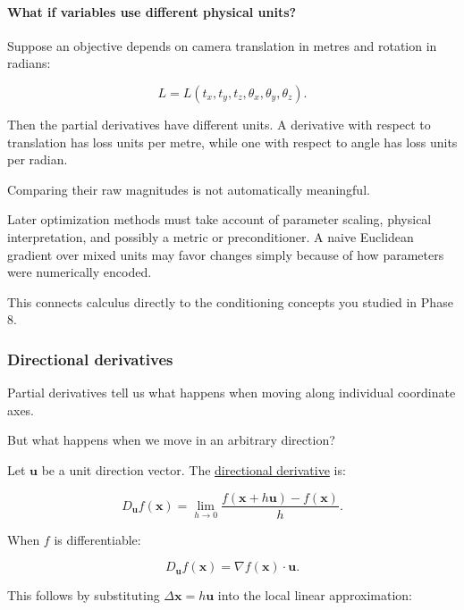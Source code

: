 \paragraph{What if variables use different physical units?}\label{02-foundations-ii-ch021-what-if-variables-use-different-physical-units}

\hypertarget{02-foundations-ii-ch021-what-if-variables-use-different-physical-units}{}

Suppose an objective depends on camera translation in metres and rotation in radians:

\[
L=L(t_x,t_y,t_z,\theta_x,\theta_y,\theta_z).
\]

Then the partial derivatives have different units. A derivative with respect to translation has loss units per metre, while one with respect to angle has loss units per radian.

Comparing their raw magnitudes is not automatically meaningful.

Later optimization methods must take account of parameter scaling, physical interpretation, and possibly a metric or preconditioner. A naive Euclidean gradient over mixed units may favor changes simply because of how parameters were numerically encoded.

This connects calculus directly to the conditioning concepts you studied in Phase 8.

\subsubsection{Directional derivatives}\label{02-foundations-ii-ch021-directional-derivatives}

\hypertarget{02-foundations-ii-ch021-directional-derivatives}{}

Partial derivatives tell us what happens when moving along individual coordinate axes.

But what happens when we move in an arbitrary direction?

Let \(\mathbf u\) be a unit direction vector. The \hyperref[02-foundations-ii-ch021-multivariable-derivatives-and-sensitivity-1]{directional derivative} is:

\[
D_{\mathbf u}f(\mathbf x) = \lim_{h\to0} \frac{f(\mathbf x+h\mathbf u)-f(\mathbf x)}h.
\]

When \(f\) is differentiable:

\[
\boxed{ D_{\mathbf u}f(\mathbf x) = \nabla f(\mathbf x)\cdot\mathbf u }.
\]

This follows by substituting \(\Delta\mathbf x=h\mathbf u\) into the local linear approximation:

